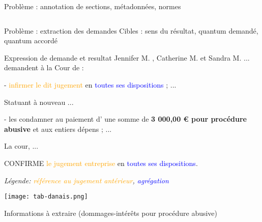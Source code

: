 \begin{frame}[c]{Problème : annotation de sections, métadonnées, normes}
    \tiny
	\lstset{language=XMl}
	\begin{columns}
		\begin{column}{.50\linewidth}
        
        \end{column}
		\begin{column}{.50\linewidth}
		
	    \end{column}
	\end{columns}
\end{frame}

\begin{frame}[c]{Problème : extraction des demandes}
	Cibles : sens du résultat, quantum demandé, quantum accordé
\begin{exampleblock}{Expression de demande et resultat}
\scriptsize
Jennifer M. , Catherine M. et Sandra M. ... demandent à la Cour de :

- \textcolor{orange}{infirmer le dit jugement} en \textcolor{blue}{toutes ses dispositions} ; 
...

Statuant à nouveau ...

- les condamner au paiement d' une somme de  \textbf{3 000,00 € pour procédure abusive} et
aux entiers dépens ; ...

La cour, ...  

CONFIRME \textcolor{orange}{le jugement entreprise} en \textcolor{blue}{toutes ses dispositions}.

\end{exampleblock}

\scriptsize{\textit{Légende:  \textcolor{orange}{référence au jugement antérieur},  \textcolor{blue}{agrégation}}}


\begin{table} 
\centering \texttt{[image: tab-danais.png]}
\caption{\scriptsize Informations à extraire (dommages-intérêts pour procédure abusive)}
\end{table}
\end{frame}

